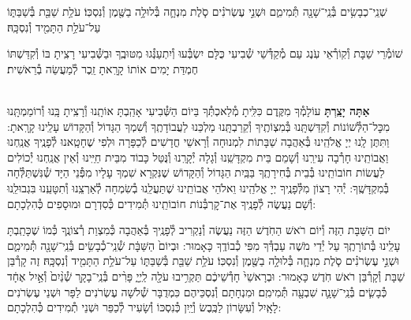 \documentclass[twoside, openany, parskip=half, 11pt]{book}
\begin{document}
שְׁנֵֽי־כְבָשִׂ֥ים בְּ֯נֵֽי־שָׁנָ֖ה תְּ֯מִימִ֑ם וּשְׁנֵ֣י עֶשְׂרֹנִ֗ים סֹ֧לֶת מִנְחָ֛ה בְּ֯לוּלָ֥ה בַשֶּׁ֖מֶן וְ֯נִסְכּֽוֹ׃ עֹלַ֥ת שַׁבַּ֖ת בְּ֯שַׁבַּתּ֑וֹ עַל־עֹלַ֥ת הַתָּמִ֖יד וְ֯נִסְכָּֽהּ׃

שׁוֹמְ֯רֵי שַׁבָּת וְ֯קֽוֹרְ֯אֵי עֹֽנֶג עַם מְ֯קַדְּ֯שֵׁי שְׁ֯בִיעִי כֻּלָּם יִשְׂבְּ֯עוּ וְ֯יִתְעַנְּ֯גוּ מִטּוּבֶֽךָ וּבַשְּׁ֯בִיעִי רָצִֽיתָ בּוֹ וְ֯קִדַּשְׁתּוֹ חֶמְדַּת יָמִים אוֹתוֹ קָרָֽאתָ זֵֽכֶר לְ֯מַעֲשֵׂה בְ֯רֵאשִׁית׃

\shabboskiddushhayom {}

\begin{sometimes}

\label{shabbosroshchodesh}
\\
\textbf{אַתָּה יָצַֽרְתָּ}
עוֹלָמְ֯ךָ מִקֶּֽדֶם כִּלִּֽיתָ מְ֯לַאכְתְּ֯ךָ בַּיוֹם הַשְּׁ֯בִיעִי אָהַֽבְתָּ אוֹתָֽנוּ וְ֯רָצִֽיתָ בָּֽנוּ וְ֯רוֹמַמְתָּֽנוּ מִכׇּל־הַלְּ֯שׁוֹנוֹת וְ֯קִדַּשְׁתָּֽנוּ בְּ֯מִצְוֹתֶֽיךָ וְ֯קֵרַבְתָּֽנוּ מַלְכֵּנוּ לַעֲבוֹדָתֶֽךָ וְ֯שִׁמְךָ הַגָּדוֹל וְ֯הַקָּדוֹשׁ עָלֵֽינוּ קָרָֽאתָ: וַתִּתֶּן לָֽנוּ יְיָ אֱלֹהֵֽינוּ בְּ֯אַהֲבָה שַׁבָּתוֹת לִמְנוּחָה וְ֯רָאשֵׁי חֳדָשִׁים לְ֯כַפָּרָה וּלְפִי שֶׁחָטָֽאנוּ לְ֯פָנֶֽיךָ אֲנַֽחְנוּ וַאֲבוֹתֵֽינוּ חָרְ֯בָה עִירֵֽנוּ וְ֯שָׁמֵם בֵּית מִקְדָּשֵֽׁנוּ וְ֯גָלָה יְ֯קָרֵֽנוּ וְ֯נֻּטַּל כָּבוֹד מִבֵּית חַיֵּֽינוּ וְ֯אֵין אֲנַֽחְנוּ יְ֯כוֹלִים לַעֲשׂוֹת חוֹבוֹתֵֽינוּ בְּ֯בֵית בְּ֯חִירָתֶֽךָ בַּבַּֽיִת הַגָּדוֹל וְ֯הַקָּדוֹשׁ שֶׁנִּקְרָא שִׁמְךָ עָלָיו מִפְּ֯נֵי הַיָּד שְׁ֯נִּשְׁתַּלְּ֯חָה בְּ֯מִקְדָּשֶֽׁךָ: יְ֯הִי רָצוֹן מִלְּ֯פָנֶֽיךָ יְיָ אֱלֹהֵֽינוּ וֵאלֹהֵי אֲבוֹתֵֽינוּ שֶׁתַּעֲלֵֽנוּ בְ֯שִׂמְחָה לְ֯אַרְצֵֽנוּ וְ֯תִטָּעֵֽנוּ בִּגְבוּלֵֽנוּ וְ֯שָׁם נַעֲשֶׂה לְ֯פָנֶֽיךָ אֶת־קׇרְבְּ֯נוֹת חוֹבוֹתֵֽינוּ תְּ֯מִידִים כְּ֯סִדְרָם וּמוּסָפִים כְּ֯הִלְכָתָם:

יוֹם הַשַּׁבָּת הַזֶּה וְ֯יוֹם רֹאשׁ הַחֹֽדֶשׁ הַזֶּה נַעֲשֶׂה וְ֯נַקְרִיב לְ֯פָנֶֽיךָ בְּ֯אַהֲבָה כְּ֯מִצְוַת רְ֯צוֹנֶֽךָ כְּ֯מוֹ שֶׁכָּתַֽבְתָּ עָלֵֽינוּ בְּ֯תוֹרָתֶֽךָ עַל יְ֯דֵי מֹשֶׁה עַבְדְּ֯ךָ מִפִּי כְ֯בוֹדֶֽךָ כָּאָמוּר: וּבְיוֹם֙ הַשַּׁבָּ֔ת שְׁ֯נֵֽי־כְ֯בָשִׂ֥ים בְּ֯נֵֽי־שָׁנָ֖ה תְּ֯מִימִ֑ם וּשְׁנֵ֣י עֶשְׂרֹנִ֗ים סֹ֧לֶת מִנְחָ֛ה בְּ֯לוּלָ֥ה בַשֶּׁ֖מֶן וְ֯נִסְכּֽוֹ׃ עֹלַ֥ת שַׁבַּ֖ת בְּ֯שַׁבַּתּ֑וֹ עַל־עֹלַ֥ת הַתָּמִ֖יד וְ֯נִסְכָּֽהּ׃ זֶה קָרְ֯בַּן שַׁבָּת וְ֯קָרְ֯בַּן רֹאשׁ חֹֽדֶשׁ כָּאָמוּר: וּבְרָאשֵׁי֙ חָדְ֯שֵׁיכֶ֔ם תַּקְרִ֥יבוּ עֹלָ֖ה לַֽיְיָ֑ פָּרִ֨ים בְּ֯נֵֽי־בָקָ֤ר שְׁ֯נַ֨יִם֙ וְ֯אַ֣יִל אֶחָ֔ד כְּ֯בָשִׂ֧ים בְּ֯נֵֽי־שָׁנָ֛ה שִׁבְעָ֖ה תְּ֯מִימִֽם׃ וּמִנְחָתָם וְ֯נִסְכֵּיהֶם כִּמְדֻבָּר שְׁ֯לֹשָׁה עֶשְׂרֹנִים לַפָּר וּשְׁנֵי עֶשְׂרֹנִים לָאָֽיִל וְ֯עִשָּׂרוֹן לַכֶּֽבֶשׂ וְ֯יַֽיִן כְּ֯נִסְכּוֹ וְ֯שָׂעִיר לְ֯כַפֵּר וּשְׁנֵי תְ֯מִידִים כְּ֯הִלְכָתָם:


\end{sometimes}
\end{document}
